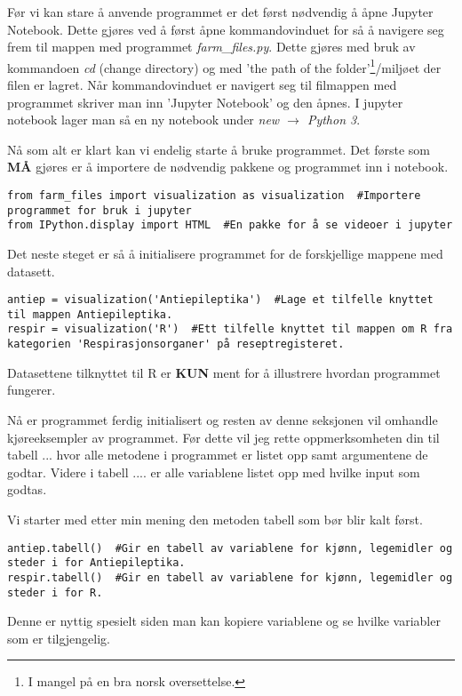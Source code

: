 \documentclass[12pt,norsk,a4paper,fleqn]{article}
\numberwithin{equation}{section}
\begin{document}
Før vi kan stare å anvende programmet er det først nødvendig å åpne Jupyter Notebook. Dette gjøres ved å først åpne kommandovinduet for så å navigere seg frem til mappen med programmet \textit{farm\_files.py}. Dette gjøres med bruk av kommandoen \textit{cd} (change directory) og med 'the path of the folder'\footnote{I mangel på en bra norsk oversettelse.}/miljøet der filen er lagret. Når kommandovinduet er navigert seg til filmappen med programmet skriver man inn 'Jupyter Notebook' og den åpnes. I jupyter notebook lager man så en ny notebook under \textit{new \(\rightarrow\) Python 3}.

Nå som alt er klart kan vi endelig starte å bruke programmet. Det første som \textbf{MÅ} gjøres er å importere de nødvendig pakkene og programmet inn i notebook.
\begin{lstlisting}
from farm_files import visualization as visualization  #Importere programmet for bruk i jupyter
from IPython.display import HTML  #En pakke for å se videoer i jupyter
\end{lstlisting}
Det neste steget er så å initialisere programmet for de forskjellige mappene med datasett.
\begin{lstlisting}
antiep = visualization('Antiepileptika')  #Lage et tilfelle knyttet til mappen Antiepileptika.
respir = visualization('R')  #Ett tilfelle knyttet til mappen om R fra kategorien 'Respirasjonsorganer' på reseptregisteret.
\end{lstlisting}
Datasettene tilknyttet til R er \textbf{KUN} ment for å illustrere hvordan programmet fungerer.

Nå er programmet ferdig initialisert og resten av denne seksjonen vil omhandle kjøreeksempler av programmet. Før dette vil jeg rette oppmerksomheten din til tabell ... hvor alle metodene i programmet er listet opp samt argumentene de godtar. Videre i tabell .... er alle variablene listet opp med hvilke input som godtas.

Vi starter med etter min mening den metoden {\color{blue}tabell} som bør blir kalt først.
\begin{lstlisting}
antiep.tabell()  #Gir en tabell av variablene for kjønn, legemidler og steder i for Antiepileptika.
respir.tabell()  #Gir en tabell av variablene for kjønn, legemidler og steder i for R.
\end{lstlisting}
Denne er nyttig spesielt siden man kan kopiere variablene og se hvilke variabler som er tilgjengelig. 
\end{document}
